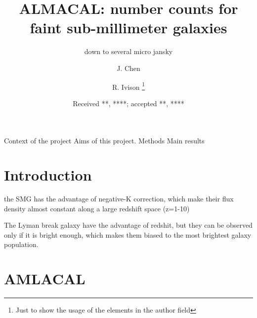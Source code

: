 \documentclass{aa}
\begin{document}
 


   \title{ALMACAL: number counts for faint sub-millimeter galaxies}

   \subtitle{down to several micro jansky}

   \author{J. Chen
          \and
          R. Ivison \fnmsep\thanks{Just to show the usage
          of the elements in the author field}
          }


   \date{Received **, ****; accepted **, ****}

 
  \abstract
   {Context of the project}
   {Aims of this project.}
   {Methods}
   {Main results}
   {}


   \maketitle
%

\section{Introduction}

the SMG has the advantage of negative-K correction, which make their flux density almost constant along a large redshift space (z=1-10)

The Lyman break galaxy have the advantage of redshit, but they can be observed only if it is bright enough, which makes them biased to the most brightest galaxy population.


\section{AMLACAL}
\end{document}
